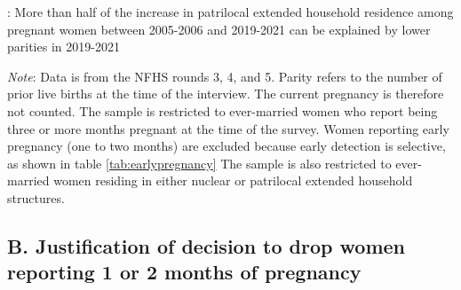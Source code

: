 \documentclass[10pt,twoside,reqno]{article}
\begin{document}
\begin{table}[H]
\sansmath
\sffamily
\captionsetup{style=CAPTAB}
\caption{: More than half of the increase in patrilocal extended household residence among pregnant women between 2005-2006 and 2019-2021 can be explained by lower parities in 2019-2021}
\label{tab:proppatrilocal}
\vspace{-4pt}

\begin{center}
\begin{scriptsize}
\begin{adjustbox}{max width=\textheight, max totalheight=\textwidth, keepaspectratio}
\setlength{\tabcolsep}{4pt}
\renewcommand{\arraystretch}{1.3}

\end{adjustbox}
\end{scriptsize}
\end{center}

\vspace{1ex}
\small\scriptsize{\textsf{\textit{Note}: Data is from the NFHS rounds 3, 4, and 5.}}
\newline\small\scriptsize{\textsf{Parity refers to the number of prior live births at the time of the interview.  The current pregnancy is therefore not counted.}}
\newline\small\scriptsize{\textsf{The sample is restricted to ever-married women who report being three or more months pregnant at the time of the survey. Women reporting early pregnancy (one to two months) are excluded because early detection is selective, as shown in table \ref{tab:earlypregnancy}}}
\newline\small\scriptsize{\textsf{The sample is also restricted to ever-married women residing in either nuclear or patrilocal extended household structures.}}

\end{table}


\clearpage
\renewcommand{\thesection}{B-\arabic{section}}
\setcounter{equation}{0}
\renewcommand{\theequation}{B-\arabic{equation}}
\setcounter{figure}{0}
\renewcommand{\thefigure}{B-\arabic{figure}}
\setcounter{table}{0}
\renewcommand{\thetable}{B-\arabic{table}}

\subsection*{B. Justification of decision to drop women reporting 1 or 2 months of pregnancy}
\end{document}
